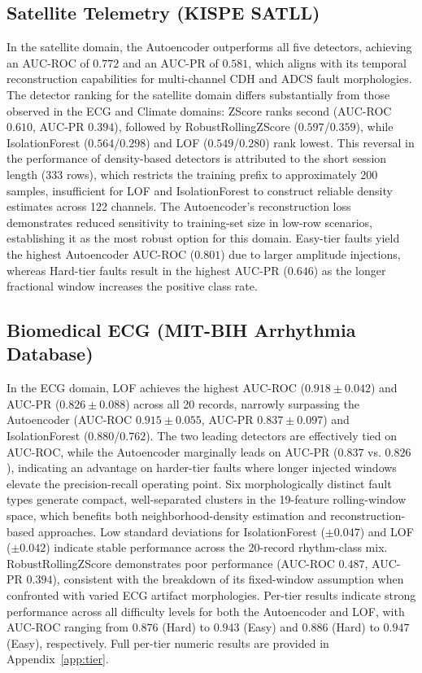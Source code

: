 \documentclass[conference]{IEEEtran}
\begin{document}
\subsection{Satellite Telemetry (KISPE SATLL)}

In the satellite domain, the Autoencoder outperforms all five detectors, achieving an AUC-ROC of $0.772$ and an AUC-PR of $0.581$, which aligns with its temporal reconstruction capabilities for multi-channel CDH and ADCS fault morphologies. The detector ranking for the satellite domain differs substantially from those observed in the ECG and Climate domains: ZScore ranks second (AUC-ROC $0.610$, AUC-PR $0.394$), followed by RobustRollingZScore ($0.597$/$0.359$), while IsolationForest ($0.564$/$0.298$) and LOF ($0.549$/$0.280$) rank lowest. This reversal in the performance of density-based detectors is attributed to the short session length (333 rows), which restricts the training prefix to approximately 200 samples, insufficient for LOF and IsolationForest to construct reliable density estimates across 122 channels. The Autoencoder's reconstruction loss demonstrates reduced sensitivity to training-set size in low-row scenarios, establishing it as the most robust option for this domain. Easy-tier faults yield the highest Autoencoder AUC-ROC ($0.801$) due to larger amplitude injections, whereas Hard-tier faults result in the highest AUC-PR ($0.646$) as the longer fractional window increases the positive class rate.

\subsection{Biomedical ECG (MIT-BIH Arrhythmia Database)}

In the ECG domain, LOF achieves the highest AUC-ROC ($0.918 \pm 0.042$) and AUC-PR ($0.826 \pm 0.088$) across all 20 records, narrowly surpassing the Autoencoder (AUC-ROC $0.915 \pm 0.055$, AUC-PR $0.837 \pm 0.097$) and IsolationForest ($0.880$/$0.762$). The two leading detectors are effectively tied on AUC-ROC, while the Autoencoder marginally leads on AUC-PR ($0.837$ vs. $0.826$), indicating an advantage on harder-tier faults where longer injected windows elevate the precision-recall operating point. Six morphologically distinct fault types generate compact, well-separated clusters in the 19-feature rolling-window space, which benefits both neighborhood-density estimation and reconstruction-based approaches. Low standard deviations for IsolationForest ($\pm 0.047$) and LOF ($\pm 0.042$) indicate stable performance across the 20-record rhythm-class mix. RobustRollingZScore demonstrates poor performance (AUC-ROC $0.487$, AUC-PR $0.394$), consistent with the breakdown of its fixed-window assumption when confronted with varied ECG artifact morphologies. Per-tier results indicate strong performance across all difficulty levels for both the Autoencoder and LOF, with AUC-ROC ranging from $0.876$ (Hard) to $0.943$ (Easy) and $0.886$ (Hard) to $0.947$ (Easy), respectively. Full per-tier numeric results are provided in Appendix~\ref{app:tier}.
\end{document}
